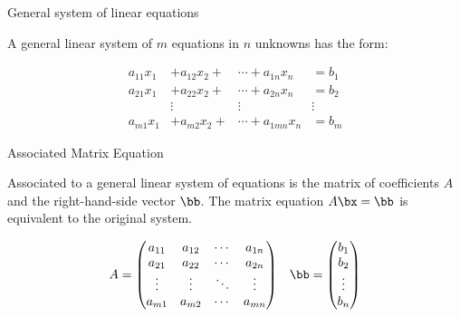 \documentclass{beamer}
\begin{document}

\begin{frame}{General system of linear equations}

A general linear system of $m$ equations in $n$ unknowns has the form:

\begin{align*}
 a_{11}x_1 &+ a_{12}x_2 + &\cdots + a_{1n} x_n &= b_1\\
 a_{21}x_1 &+ a_{22}x_2 + &\cdots + a_{2n} x_n &= b_2\\
 \quad &{ \vdots \quad} \quad &{ \vdots \quad} \quad  &{ \vdots \quad} \quad\\
 a_{m1}x_1 &+ a_{m2}x_2 + &\cdots + a_{1mn} x_n &= b_m
\end{align*}


\end{frame}

\begin{frame}{Associated Matrix Equation}

Associated to a general linear system of equations is the matrix of coefficients
$A$ and the right-hand-side vector $\bb$. The
matrix equation $A\bx = \bb$ is equivalent to the original system.

$$
\begin{matrix}
A =
\begin{pmatrix}
a_{11} & a_{12} & \cdots & a_{1n} \\
a_{21} & a_{22} & \cdots & a_{2n} \\
\vdots & \vdots & \ddots & \vdots \\
a_{m1} & a_{m2} & \cdots & a_{mn}
\end{pmatrix}
&
\bb =
\begin{pmatrix}
b_1 \\ b_2 \\ \vdots \\ b_n
\end{pmatrix}
\end{matrix}
$$


\end{frame}
\end{document}

